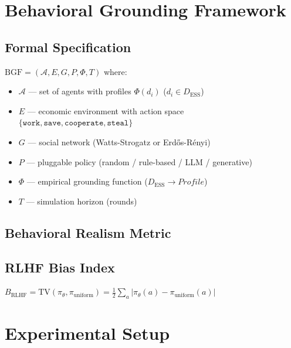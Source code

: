 \documentclass[sigconf,review]{acmart}
\begin{document}
\section{Behavioral Grounding Framework}

\subsection{Formal Specification}

$\mathrm{BGF} = (\mathcal{A}, E, G, P, \Phi, T)$ where:
\begin{itemize}
  \item $\mathcal{A}$ — set of agents with profiles $\Phi(d_i)$
        ($d_i \in D_\text{ESS}$)
  \item $E$ — economic environment with action space
        $\{\texttt{work}, \texttt{save}, \texttt{cooperate},
           \texttt{steal}\}$
  \item $G$ — social network (Watts-Strogatz or Erd\H{o}s-R\'enyi)
  \item $P$ — pluggable policy (random / rule-based / LLM / generative)
  \item $\Phi$ — empirical grounding function
        ($D_\text{ESS} \to \mathit{Profile}$)
  \item $T$ — simulation horizon (rounds)
\end{itemize}

\subsection{Behavioral Realism Metric}


\subsection{RLHF Bias Index}

$B_\text{RLHF} = \mathrm{TV}(\pi_\theta, \pi_\text{uniform})
               = \frac{1}{2}\sum_a |\pi_\theta(a) - \pi_\text{uniform}(a)|$

\section{Experimental Setup}


\end{document}
